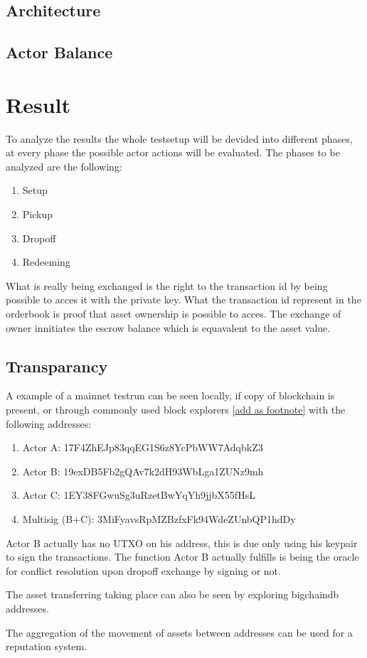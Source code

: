 \documentclass[Nomencl]{DylanMaster}
\begin{document}
\subsection{Architecture}

\subsection{Actor Balance}


\section{Result}

To analyze the results the whole testsetup will be devided into different phases, at every phase the possible actor actions will be evaluated. The phases to be analyzed are the following:
\begin{enumerate}
  \item Setup
  \item Pickup
  \item Dropoff
  \item Redeeming
\end{enumerate}

What is really being exchanged is the right to the transaction id by being possible to acces it with the private key. What the transaction id represent in the orderbook is proof that asset ownership is possible to acces. The exchange of owner innitiates the escrow balance which is equavalent to the asset value.

\subsection{Transparancy}

A example of a mainnet testrun can be seen locally, if copy of blockchain is present, or through commonly used block explorers \href{https://www.blocktrail.com/BTC}{[add as footnote]}
 with the following addresses:
\begin{enumerate}
  \item Actor A: 17F4ZhEJp83qqEG1S6z8YcPbWW7AdqbkZ3
  \item Actor B: 19exDB5Fb2gQAv7k2dH93WbLga1ZUNz9mh
  \item Actor C: 1EY38FGwuSg3uRzetBwYqYh9jjbX55fHsL
  \item Multisig (B+C): 3MiFyavsRpMZBzfxFk94WdeZUnbQP1hdDy
\end{enumerate}

Actor B actually has no UTXO on his address, this is due only using his keypair to sign the transactions. The function Actor B actually fulfills is being the oracle for conflict resolution upon dropoff exchange by signing or not.\par
The asset transferring taking place can also be seen by exploring bigchaindb addresses. \par
The aggregation of the movement of assets between addresses can be used for a reputation system.
\end{document}

